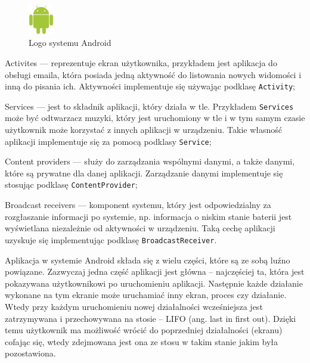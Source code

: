 \documentclass[eng,printmode,oneside]{mgr}
\begin{document}
\vspace{-2mm}
\begin{itemize}
  \item \parbox[t]{\dimexpr\textwidth-\leftmargin}{
     \vspace{-2.5mm}
    \begin{figure}
	\centering
	\includegraphics[width=0.1\textwidth]{andlogo.png}
	\caption{\label{fig:andlogo}Logo systemu Android \cite{developer.android}}
	\end{figure}
  Activites --- reprezentuje ekran użytkownika, przykładem jest aplikacja
  do obsługi emaila, która posiada jedną aktywność do listowania nowych
  widomości i inną do pisania ich. Aktywności implementuje się używając
  podklasę \texttt{Activity};
  \item Services --- jest to składnik aplikacji, który działa w tle. Przykładem
  \texttt{Services} może być odtwarzacz muzyki, który jest uruchomiony w tle i w
  tym samym czasie użytkownik może korzystać z innych aplikacji w urządzeniu.
  Takie własność aplikacji implementuje się za pomocą podklasy \texttt{Service};
	}
  \item Content providers --- służy do zarządzania wspólnymi danymi, a także
  danymi, które są prywatne dla danej aplikacji. Zarządzanie danymi
  implementuje się stosując podklasę \texttt{ContentProvider};
  \item Broadcast receivers --- komponent systemu, który jest
  odpowiedzialny za rozgłaszanie informacji po systemie, np. informacja o
  niskim stanie baterii jest wyświetlana niezależnie od aktywności w urządzeniu.
  Taką cechę aplikacji uzyskuje się implementując podklasę \texttt{BroadcastReceiver}.
\end{itemize}

Aplikacja w systemie Android składa się z wielu części, które są ze
sobą luźno powiązane. Zazwyczaj jedna część aplikacji jest główna -- najczęściej
ta, która jest pokazywana użytkownikowi po uruchomieniu aplikacji.
Następnie każde działanie wykonane na tym ekranie może uruchamiać inny ekran,
proces czy działanie. Wtedy przy każdym uruchomieniu nowej działalności
wcześniejsza jest zatrzymywana i przechowywana na stosie -- LIFO (ang. last in
first out). Dzięki temu użytkownik ma możliwość wrócić do poprzedniej
działalności (ekranu) cofając się, wtedy zdejmowana jest ona ze stosu w takim
stanie jakim była pozostawiona.
\end{document}
